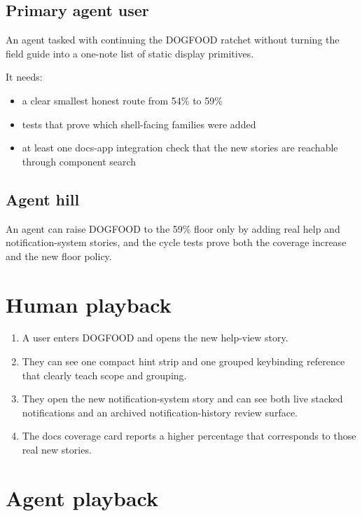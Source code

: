 \subsection{Primary agent user}\label{record-075-primary-agent-user}

An agent tasked with continuing the DOGFOOD ratchet without turning the field guide into a one-note list of static display primitives.

It needs:

\begin{itemize}
\tightlist
\item
  a clear smallest honest route from 54\% to 59\%
\item
  tests that prove which shell-facing families were added
\item
  at least one docs-app integration check that the new stories are reachable through component search
\end{itemize}

\subsection{Agent hill}\label{record-075-agent-hill}

An agent can raise DOGFOOD to the 59\% floor only by adding real help and notification-system stories, and the cycle tests prove both the coverage increase and the new floor policy.

\section{Human playback}\label{record-075-human-playback}

\begin{enumerate}
\def\labelenumi{\arabic{enumi}.}
\tightlist
\item
  A user enters DOGFOOD and opens the new help-view story.
\item
  They can see one compact hint strip and one grouped keybinding reference that clearly teach scope and grouping.
\item
  They open the new notification-system story and can see both live stacked notifications and an archived notification-history review surface.
\item
  The docs coverage card reports a higher percentage that corresponds to those real new stories.
\end{enumerate}

\section{Agent playback}\label{record-075-agent-playback}

